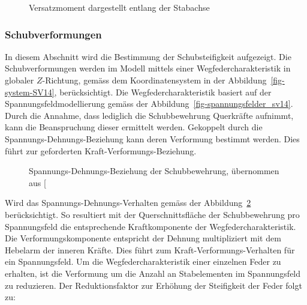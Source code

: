 \documentclass[
  11pt,
  letterpaper,
]{scrreprt}
\begin{document}
\begin{figure}[H]


\caption{\label{fig-versatzmoment_sv14}Versatzmoment dargestellt entlang
der Stabachse}

\end{figure}%

\subsubsection{Schubverformungen}\label{schubverformungen-1}

In diesem Abschnitt wird die Bestimmung der Schubsteifigkeit aufgezeigt.
Die Schubverformungen werden im Modell mittels einer
Wegfedercharakteristik in globaler \(Z\)-Richtung, gemäss dem
Koordinatensystem in der Abbildung~\ref{fig-system-SV14},
berücksichtigt. Die Wegfedercharakteristik basiert auf der
Spannungsfeldmodellierung gemäss der
Abbildung~\ref{fig-spannungsfelder_sv14}. Durch die Annahme, dass
lediglich die Schubbewehrung Querkräfte aufnimmt, kann die Beanspruchung
dieser ermittelt werden. Gekoppelt durch die
Spannungs-Dehnungs-Beziehung kann deren Verformung bestimmt werden. Dies
führt zur geforderten Kraft-Verformungs-Beziehung.

\begin{figure}[H]


\caption{\label{fig-sigma-epsilon-sv14}Spannungs-Dehnungs-Beziehung der
Schubbewehrung, übernommen aus
{[}\citeproc{ref-gitz_ansatze_2024}{1}{]}}

\end{figure}%

Wird das Spannungs-Dehnungs-Verhalten gemäss der
Abbildung~\ref{fig-sigma-epsilon-sv14} berücksichtigt. So resultiert mit
der Querschnittsfläche der Schubbewehrung pro Spannungsfeld die
entsprechende Kraftkomponente der Wegfedercharakteristik. Die
Verformungskomponente entspricht der Dehnung multipliziert mit dem
Hebelarm der inneren Kräfte. Dies führt zum Kraft-Verformungs-Verhalten
für ein Spannungsfeld. Um die Wegfedercharakteristik einer einzelnen
Feder zu erhalten, ist die Verformung um die Anzahl an Stabelementen im
Spannungsfeld zu reduzieren. Der Reduktionsfaktor zur Erhöhung der
Steifigkeit der Feder folgt zu:
\end{document}
